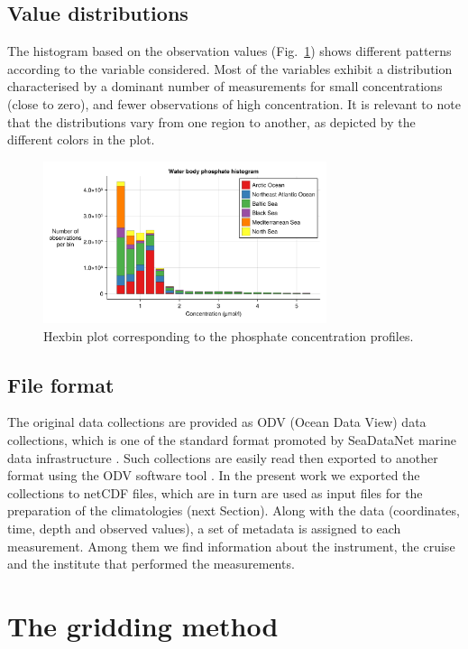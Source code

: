\documentclass[essd, manuscript]{copernicus}
\begin{document}
\subsection{Value distributions}

The histogram based on the observation values (Fig.~\ref{fig:histogram_value_Water_body_phosphate}) shows different patterns according to the variable considered. Most of the variables exhibit a distribution characterised by a dominant number of measurements for small concentrations (close to zero), and fewer observations of high concentration. It is relevant to note that the distributions vary from one region to another, as depicted by the different colors in the plot.  

\begin{figure}[t]
\centering
\includegraphics[width=8.3cm]{histogram_value_Water_body_phosphate.png}
\caption{Hexbin plot corresponding to the phosphate concentration profiles.\label{fig:histogram_value_Water_body_phosphate}}
\end{figure}


\subsection{File format}

The original data collections are provided as ODV (Ocean Data View) data collections, which is one of the standard format promoted by SeaDataNet marine data infrastructure \citep{Lowry2023}. Such collections are easily read then exported to another format using the ODV software tool \citep{SCHLITZER2002}. In the present work we exported the collections to netCDF files, which are in turn are used as input files for the preparation of the climatologies (next Section). Along with the data (coordinates, time, depth and observed values), a set of metadata is assigned to each measurement. Among them we find information about the instrument, the cruise and the institute that performed the measurements. 

\section{The gridding method\label{sec:method}}
\end{document}

